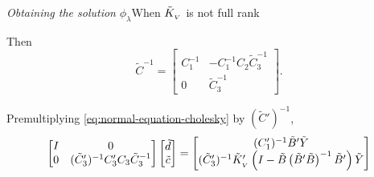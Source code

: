 \begin{frame}{\textit{Obtaining the solution}  $\phi_\lambda$}{When $\tilde{K}_{_{V}}$ is not full rank}
\footnotesize

Then
\begin{equation} \label{eq:cholesky-factor-mod-inverse}
\tilde{C}^{-1} = \begin{bmatrix}
C_1^{-1} & -C_1^{-1} C_2 \tilde{C}_3^{-1} \\
0  & \tilde{C}_3^{-1}
\end{bmatrix}.
\end{equation}

Premultiplying \eqref{eq:normal-equation-cholesky} by $(\tilde{C}')^{-1}$, 
\begin{equation*}%
\begin{bmatrix}
I & 0 \\
0 & (\tilde{C}'_3)^{-1} C'_3 C_3 \tilde{C}_3^{-1}\\
\end{bmatrix}
\begin{bmatrix}
\tilde{d}\\
\tilde{c}\\
\end{bmatrix}
= \begin{bmatrix}
(C'_1)^{-1} \tildeB'\tildeY \\
(\tilde{C}'_3)^{-1} \tildeK_{_{ V}}'\left( I - \tildeB\left( \tildeB' \tildeB \right)^{-1} \tildeB' \right) \tildeY\\
\end{bmatrix}
\end{equation*}
\end{frame}

